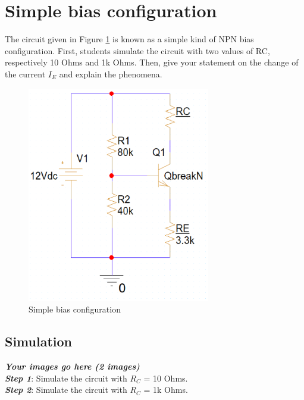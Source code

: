 \section{Simple bias configuration}
The circuit given in Figure \ref{lab3_ex5_de} is known as a simple kind of NPN bias configuration. First, students simulate the circuit with two values of RC, respectively 10 Ohms and 1k Ohms. Then, give your statement on the change of the current $I_E$ and explain the phenomena.
\begin{figure}[h]
    \centering
    \includegraphics[width=8cm]{graphics/ex5/f1.png}
    \caption{Simple bias configuration}
    \label{lab3_ex5_de}
\end{figure}
\pagebreak
\subsection{Simulation}
\textbf{\textit{Your images go here (2 images)}}\\
\textbf{\textit{Step 1}}: Simulate the circuit with $R_C$ = 10 Ohms.\\
\textbf{\textit{Step 2}}: Simulate the circuit with $R_C$ = 1k Ohms.

